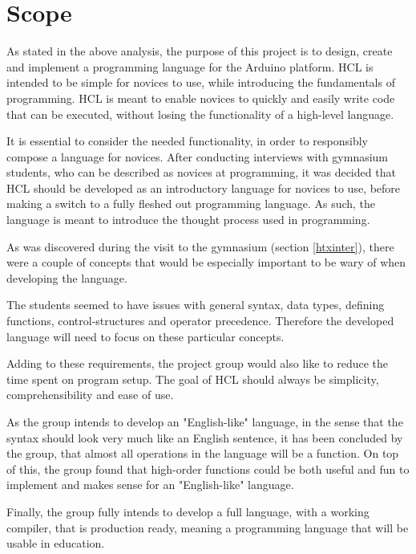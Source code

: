 \section{Scope}
As stated in the above analysis, the purpose of this project is to design, create and implement a programming language for the Arduino platform.
HCL is intended to be simple for novices to use, while introducing the fundamentals of programming.
HCL is meant to enable novices to quickly and easily write code that can be executed, without losing the functionality of a high-level language.

It is essential to consider the needed functionality, in order to responsibly compose a language for novices.
After conducting interviews with gymnasium students, who can be described as novices at programming, it was decided that HCL should be developed as an introductory language for novices to use, before making a switch to a fully fleshed out programming language.
As such, the language is meant to introduce the thought process used in programming.

As was discovered during the visit to the gymnasium (section \ref{htxinter}), there were a couple of concepts that would be especially important to be wary of when developing the language.

The students seemed to have issues with general syntax, data types, defining functions, control-structures and operator precedence.
Therefore the developed language will need to focus on these particular concepts. 

Adding to these requirements, the project group would also like to reduce the time spent on program setup.
The goal of HCL should always be simplicity, comprehensibility and ease of use.

As the group intends to develop an "English-like" language, in the sense that the syntax should look very much like an English sentence, it has been concluded by the group, that almost all operations in the language will be a function. 
On top of this, the group found that high-order functions could be both useful and fun to implement and makes sense for an "English-like" language. 

Finally, the group fully intends to develop a full language, with a working compiler, that is production ready, meaning a programming language that will be usable in education.

 
